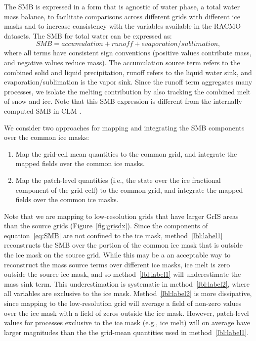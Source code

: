 \documentclass[draft]{agujournal2019}
\begin{document}
The SMB is expressed in a form that is agnostic of water phase, a total water mass balance, to facilitate comparisons across different grids with different ice masks and to increase consistency with the variables available in the RACMO datasets. The SMB for total water can be expressed as:
\begin{equation}
SMB = accumulation + runoff + evaporation/sublimation, \label{eq:SMB}
\end{equation}
where all terms have consistent sign conventions (positive values contribute mass, and negative values reduce mass). The accumulation source term refers to the combined solid and liquid precipitation, runoff refers to the liquid water sink, and evaporation/sublimation is the vapor sink. Since the runoff term aggregates many processes, we isolate the melting contribution by also tracking the combined melt of snow and ice. Note that this SMB expression is different from the internally computed SMB in CLM \cite{KETAL2020JAMES}.

We consider two approaches for mapping and integrating the SMB components over the common ice masks:
\begin{enumerate}
\item Map the grid-cell mean quantities to the common grid, and integrate the mapped fields over the common ice masks. \label{lbl:label1}
\item Map the patch-level quantities (i.e., the state over the ice fractional component of the grid cell) to the common grid, and integrate the mapped fields over the common ice masks. \label{lbl:label2}
\end{enumerate}

Note that we are mapping to low-resolution grids that have larger GrIS areas than the source grids (Figure~\ref{fig:grisdx}). Since the components of equation~\ref{eq:SMB} are not confined to the ice mask, method~\ref{lbl:label1} reconstructs the SMB over the portion of the common ice mask that is outside the ice mask on the source grid. While this may be a an acceptable way to reconstruct the mass source terms over different ice masks, ice melt is zero outside the source ice mask, and so method~\ref{lbl:label1} will underestimate the mass sink term. This underestimation is systematic in method~\ref{lbl:label2}, where all variables are exclusive to the ice mask. Method~\ref{lbl:label2} is more dissipative, since mapping to the low-resolution grid will average a field of non-zero values over the ice mask with a field of zeros outside the ice mask. However, patch-level values for processes exclusive to the ice mask (e.g., ice melt) will on average have larger magnitudes than the the grid-mean quantities used in method~\ref{lbl:label1}. %
\end{document}
